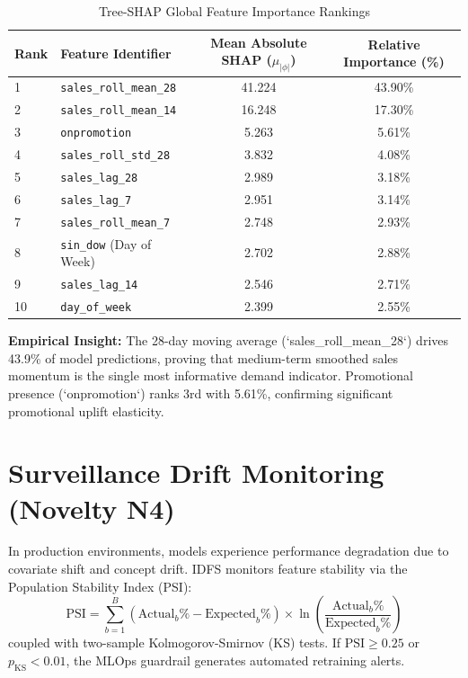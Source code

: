 \documentclass[12pt,a4paper,oneside]{report}
\theoremstyle{definition}
\begin{document}
\begin{table}[H]
\centering
\caption{Tree-SHAP Global Feature Importance Rankings}
\label{tab:shap_importance}
\begin{tabular}{llcc}
\toprule
\textbf{Rank} & \textbf{Feature Identifier} & \textbf{Mean Absolute SHAP ($\mu_{|\phi|}$)} & \textbf{Relative Importance (\%)} \\
\midrule
1 & \texttt{sales\_roll\_mean\_28} & 41.224 & 43.90\% \\
2 & \texttt{sales\_roll\_mean\_14} & 16.248 & 17.30\% \\
3 & \texttt{onpromotion} & 5.263 & 5.61\% \\
4 & \texttt{sales\_roll\_std\_28} & 3.832 & 4.08\% \\
5 & \texttt{sales\_lag\_28} & 2.989 & 3.18\% \\
6 & \texttt{sales\_lag\_7} & 2.951 & 3.14\% \\
7 & \texttt{sales\_roll\_mean\_7} & 2.748 & 2.93\% \\
8 & \texttt{sin\_dow} (Day of Week) & 2.702 & 2.88\% \\
9 & \texttt{sales\_lag\_14} & 2.546 & 2.71\% \\
10 & \texttt{day\_of\_week} & 2.399 & 2.55\% \\
\bottomrule
\end{tabular}
\end{table}

\noindent \textbf{Empirical Insight:} The 28-day moving average (`sales_roll_mean_28`) drives 43.9\% of model predictions, proving that medium-term smoothed sales momentum is the single most informative demand indicator. Promotional presence (`onpromotion`) ranks 3rd with 5.61\%, confirming significant promotional uplift elasticity.

\section{Surveillance Drift Monitoring (Novelty N4)}
In production environments, models experience performance degradation due to covariate shift and concept drift. IDFS monitors feature stability via the Population Stability Index (PSI):
\begin{equation}
\text{PSI} = \sum_{b=1}^B \left( \text{Actual}_b\% - \text{Expected}_b\% \right) \times \ln\left( \frac{\text{Actual}_b\%}{\text{Expected}_b\%} \right)
\end{equation}
coupled with two-sample Kolmogorov-Smirnov (KS) tests. If $\text{PSI} \ge 0.25$ or $p_{\text{KS}} < 0.01$, the MLOps guardrail generates automated retraining alerts.
\end{document}
